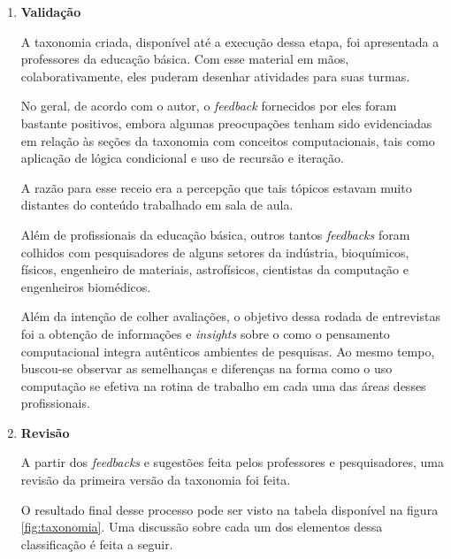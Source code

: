 \begin{enumerate}
  \item \textbf{Validação} 
  
  A taxonomia criada, disponível até a execução dessa etapa, foi apresentada a professores da educação básica. Com esse material em mãos, colaborativamente, eles puderam desenhar atividades para suas turmas. 

  No geral, de acordo com o autor, o \textit{feedback} fornecidos por eles foram bastante positivos, embora algumas preocupações tenham sido evidenciadas em relação às seções da taxonomia com conceitos computacionais, tais como aplicação de lógica condicional e uso de recursão e iteração. 
  
  A razão para esse receio era a percepção que tais tópicos estavam muito distantes do conteúdo trabalhado em sala de aula.

  Além de profissionais da educação básica, outros tantos \textit{feedbacks} foram colhidos com pesquisadores de alguns setores da indústria, bioquímicos, físicos, engenheiro de materiais, astrofísicos, cientistas da computação e engenheiros biomédicos.

  Além da intenção de colher avaliações, o objetivo dessa rodada de entrevistas foi a obtenção de informações e \textit{insights} sobre o como o pensamento computacional integra autênticos ambientes de pesquisas. Ao mesmo tempo, buscou-se observar as semelhanças e diferenças na forma como o uso computação se efetiva na rotina de trabalho em cada uma das áreas desses profissionais.

  \item \textbf{Revisão} 

  A partir dos \textit{feedbacks} e sugestões feita pelos professores e pesquisadores, uma revisão da primeira versão da taxonomia foi feita.

  O resultado final desse processo pode ser visto na tabela disponível na figura \ref{fig:taxonomia}. Uma discussão sobre cada um dos elementos dessa classificação é feita a seguir.
\end{enumerate}



